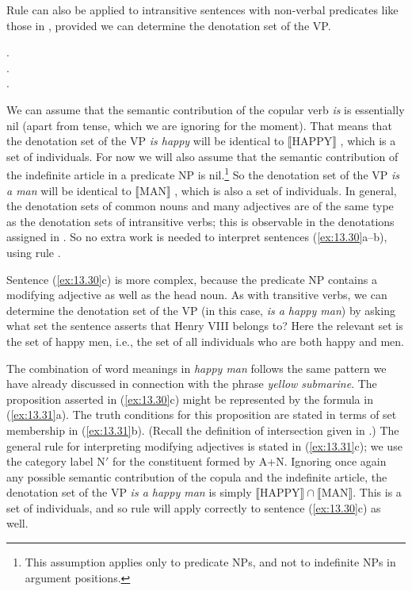 Rule  can also be applied to intransitive sentences with non-verbal predicates like those in , provided we can determine the denotation set of the VP.


\ea \label{ex:13.30}
.\\
.\\
.
                       \z
\z


We can assume that the semantic contribution of the copular verb \textit{is} is essentially nil (apart from tense, which we are ignoring for the moment). That means that the denotation set of the VP \textit{is happy} will be identical to $\llbracket\text{HAPPY}\rrbracket$ , which is a set of individuals. For now we will also assume that the semantic contribution of the indefinite article in a predicate NP is nil.\footnote{This assumption applies only to predicate NPs, and not to indefinite NPs in argument positions.} So the denotation set of the VP \textit{is a man} will be identical to $\llbracket\text{MAN}\rrbracket$ , which is also a set of individuals. In general, the denotation sets of common nouns and many adjectives are of the same type as the denotation sets of intransitive verbs; this is observable in the denotations assigned in . So no extra work is needed to interpret sentences (\ref{ex:13.30}a--b), using rule .



Sentence (\ref{ex:13.30}c) is more complex, because the predicate NP contains a modifying adjective as well as the head noun. As with transitive verbs, we can determine the denotation set of the VP (in this case, \textit{is a happy man}) by asking what set the sentence asserts that Henry VIII belongs to? Here the relevant set is the set of happy men, i.e., the set of all individuals who are both happy and men.



The combination of word meanings in \textit{happy man} follows the same pattern we have already discussed in connection with the phrase \textit{yellow submarine}. The proposition asserted in (\ref{ex:13.30}c) might be represented by the formula in (\ref{ex:13.31}a). The truth conditions for this proposition are stated in terms of set membership in (\ref{ex:13.31}b). (Recall the definition of intersection given in .) The general rule for interpreting modifying adjectives is stated in (\ref{ex:13.31}c); we use the category label N$'$ for the constituent formed by A+N. Ignoring once again any possible semantic contribution of the copula and the indefinite article, the denotation set of the VP \textit{is a happy man} is simply $\llbracket\text{HAPPY}\rrbracket {\cap} \llbracket\text{MAN}\rrbracket$. This is a set of individuals, and so rule  will apply correctly to sentence (\ref{ex:13.30}c) as well.


